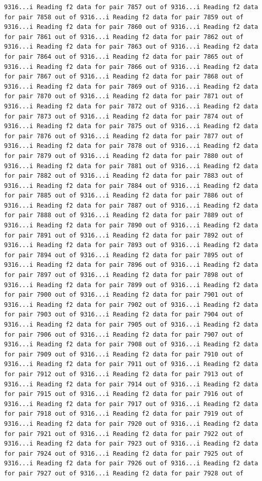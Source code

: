\documentclass[
]{article}
\begin{document}
\begin{verbatim}
9316...i Reading f2 data for pair 7857 out of 9316...i Reading f2 data for pair 7858 out of 9316...i Reading f2 data for pair 7859 out of 9316...i Reading f2 data for pair 7860 out of 9316...i Reading f2 data for pair 7861 out of 9316...i Reading f2 data for pair 7862 out of 9316...i Reading f2 data for pair 7863 out of 9316...i Reading f2 data for pair 7864 out of 9316...i Reading f2 data for pair 7865 out of 9316...i Reading f2 data for pair 7866 out of 9316...i Reading f2 data for pair 7867 out of 9316...i Reading f2 data for pair 7868 out of 9316...i Reading f2 data for pair 7869 out of 9316...i Reading f2 data for pair 7870 out of 9316...i Reading f2 data for pair 7871 out of 9316...i Reading f2 data for pair 7872 out of 9316...i Reading f2 data for pair 7873 out of 9316...i Reading f2 data for pair 7874 out of 9316...i Reading f2 data for pair 7875 out of 9316...i Reading f2 data for pair 7876 out of 9316...i Reading f2 data for pair 7877 out of 9316...i Reading f2 data for pair 7878 out of 9316...i Reading f2 data for pair 7879 out of 9316...i Reading f2 data for pair 7880 out of 9316...i Reading f2 data for pair 7881 out of 9316...i Reading f2 data for pair 7882 out of 9316...i Reading f2 data for pair 7883 out of 9316...i Reading f2 data for pair 7884 out of 9316...i Reading f2 data for pair 7885 out of 9316...i Reading f2 data for pair 7886 out of 9316...i Reading f2 data for pair 7887 out of 9316...i Reading f2 data for pair 7888 out of 9316...i Reading f2 data for pair 7889 out of 9316...i Reading f2 data for pair 7890 out of 9316...i Reading f2 data for pair 7891 out of 9316...i Reading f2 data for pair 7892 out of 9316...i Reading f2 data for pair 7893 out of 9316...i Reading f2 data for pair 7894 out of 9316...i Reading f2 data for pair 7895 out of 9316...i Reading f2 data for pair 7896 out of 9316...i Reading f2 data for pair 7897 out of 9316...i Reading f2 data for pair 7898 out of 9316...i Reading f2 data for pair 7899 out of 9316...i Reading f2 data for pair 7900 out of 9316...i Reading f2 data for pair 7901 out of 9316...i Reading f2 data for pair 7902 out of 9316...i Reading f2 data for pair 7903 out of 9316...i Reading f2 data for pair 7904 out of 9316...i Reading f2 data for pair 7905 out of 9316...i Reading f2 data for pair 7906 out of 9316...i Reading f2 data for pair 7907 out of 9316...i Reading f2 data for pair 7908 out of 9316...i Reading f2 data for pair 7909 out of 9316...i Reading f2 data for pair 7910 out of 9316...i Reading f2 data for pair 7911 out of 9316...i Reading f2 data for pair 7912 out of 9316...i Reading f2 data for pair 7913 out of 9316...i Reading f2 data for pair 7914 out of 9316...i Reading f2 data for pair 7915 out of 9316...i Reading f2 data for pair 7916 out of 9316...i Reading f2 data for pair 7917 out of 9316...i Reading f2 data for pair 7918 out of 9316...i Reading f2 data for pair 7919 out of 9316...i Reading f2 data for pair 7920 out of 9316...i Reading f2 data for pair 7921 out of 9316...i Reading f2 data for pair 7922 out of 9316...i Reading f2 data for pair 7923 out of 9316...i Reading f2 data for pair 7924 out of 9316...i Reading f2 data for pair 7925 out of 9316...i Reading f2 data for pair 7926 out of 9316...i Reading f2 data for pair 7927 out of 9316...i Reading f2 data for pair 7928 out of 
\end{verbatim}
\end{document}

